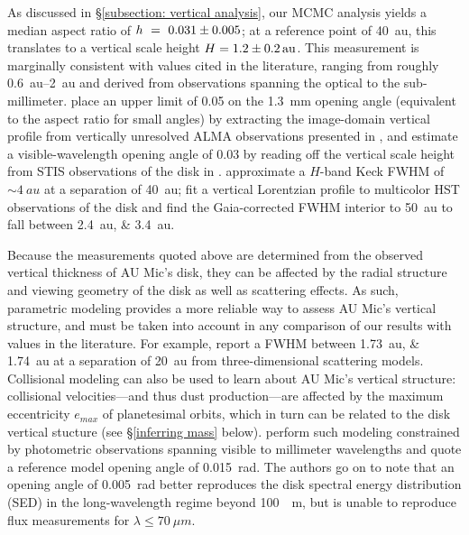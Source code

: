 \documentclass[modern]{aastex62}
\begin{document}
As discussed in \S \ref{subsection: vertical analysis}, our MCMC analysis yields a median aspect ratio of $h~=~\num{0.031 \pm 0.005}$; at a reference point of \SI{40}{au}, this translates to a vertical scale height $H = \SI{1.2 \pm 0.2}{au}$.
This measurement is marginally consistent with values cited in the literature, ranging from roughly \SIrange{0.6}{2}{au} and derived from observations spanning the optical to the sub-millimeter.
\cite{schuppler17} place an upper limit of \SI{0.05}{\rad} on the \SI{1.3}{mm} opening angle (equivalent to the aspect ratio for small angles) by extracting the image-domain vertical profile from vertically unresolved ALMA observations presented in \cite{macgregor13}, and estimate a visible-wavelength opening angle of \SI{0.03}{\rad} by reading off the vertical scale height from STIS observations of the disk in \cite{schneider14}.
\cite{metchev05} approximate a $H$-band Keck FWHM of $\sim \SI{4}{au}$ at a separation of \SI{40}{au};
\cite{krist05} fit a vertical Lorentzian profile to multicolor HST observations of the disk and find the Gaia-corrected FWHM interior to \SI{50}{au} to fall between \SIlist{2.4;3.4}{au}.

Because the measurements quoted above are determined from the observed vertical thickness of AU Mic's disk, they can be affected by the radial structure and viewing geometry of the disk as well as scattering effects. 
As such, parametric modeling provides a more reliable way to assess AU Mic’s vertical structure, and must be taken into account in any comparison of our results with values in the literature.  
For example, \cite{krist05} report a FWHM between \SIlist{1.73;1.74}{au} at a separation of \SI{20}{au} from three-dimensional scattering models.
Collisional modeling can also be used to learn about AU Mic's vertical structure: collisional velocities---and thus dust production---are affected by the maximum eccentricity $e_{max}$ of planetesimal orbits, which in turn can be related to the disk vertical stucture (see \S \ref{inferring mass} below). 
\cite{schuppler17} perform such modeling constrained by photometric observations spanning visible to millimeter wavelengths and quote a reference model opening angle of \SI{0.015}{rad}.
The authors go on to note that an opening angle of \SI{0.005}{rad} better reproduces the disk spectral energy distribution (SED) in the long-wavelength regime beyond \SI{100}{\mu m}, but is unable to reproduce flux measurements for $\lambda \leq \SI{70}{\mu m}$.
\end{document}
